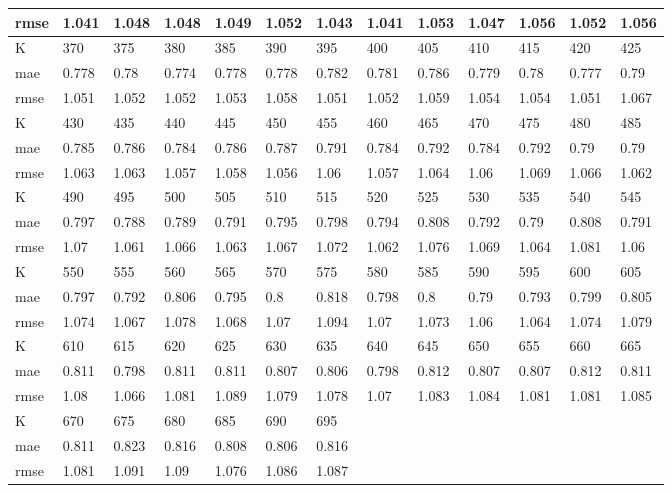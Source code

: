 \begin{appendices}
\begin{center}
\begin{tabularx}{\textwidth}{|l|X|X|X|X|X|X|X|X|X|X|X|X|}
		rmse & 1.041 & 1.048 & 1.048 & 1.049 & 1.052 & 1.043 & 1.041 & 1.053 & 1.047 & 1.056 & 1.052 & 1.056 \\ \hline 
		\hline 
		K & 370 & 375 & 380 & 385 & 390 & 395 & 400 & 405 & 410 & 415 & 420 & 425 \\ \hline 
		mae & 0.778 & 0.78 & 0.774 & 0.778 & 0.778 & 0.782 & 0.781 & 0.786 & 0.779 & 0.78 & 0.777 & 0.79 \\ \hline 
		rmse & 1.051 & 1.052 & 1.052 & 1.053 & 1.058 & 1.051 & 1.052 & 1.059 & 1.054 & 1.054 & 1.051 & 1.067 \\ \hline 
		\hline 
		K & 430 & 435 & 440 & 445 & 450 & 455 & 460 & 465 & 470 & 475 & 480 & 485 \\ \hline 
		mae & 0.785 & 0.786 & 0.784 & 0.786 & 0.787 & 0.791 & 0.784 & 0.792 & 0.784 & 0.792 & 0.79 & 0.79 \\ \hline 
		rmse & 1.063 & 1.063 & 1.057 & 1.058 & 1.056 & 1.06 & 1.057 & 1.064 & 1.06 & 1.069 & 1.066 & 1.062 \\ \hline 
		\hline 
		K & 490 & 495 & 500 & 505 & 510 & 515 & 520 & 525 & 530 & 535 & 540 & 545 \\ \hline 
		mae & 0.797 & 0.788 & 0.789 & 0.791 & 0.795 & 0.798 & 0.794 & 0.808 & 0.792 & 0.79 & 0.808 & 0.791 \\ \hline 
		rmse & 1.07 & 1.061 & 1.066 & 1.063 & 1.067 & 1.072 & 1.062 & 1.076 & 1.069 & 1.064 & 1.081 & 1.06 \\ \hline 
		\hline 
		K & 550 & 555 & 560 & 565 & 570 & 575 & 580 & 585 & 590 & 595 & 600 & 605 \\ \hline 
		mae & 0.797 & 0.792 & 0.806 & 0.795 & 0.8 & 0.818 & 0.798 & 0.8 & 0.79 & 0.793 & 0.799 & 0.805 \\ \hline 
		rmse & 1.074 & 1.067 & 1.078 & 1.068 & 1.07 & 1.094 & 1.07 & 1.073 & 1.06 & 1.064 & 1.074 & 1.079 \\ \hline 
		\hline 
		K & 610 & 615 & 620 & 625 & 630 & 635 & 640 & 645 & 650 & 655 & 660 & 665 \\ \hline 
		mae & 0.811 & 0.798 & 0.811 & 0.811 & 0.807 & 0.806 & 0.798 & 0.812 & 0.807 & 0.807 & 0.812 & 0.811 \\ \hline 
		rmse & 1.08 & 1.066 & 1.081 & 1.089 & 1.079 & 1.078 & 1.07 & 1.083 & 1.084 & 1.081 & 1.081 & 1.085 \\ \hline 
		\hline 
		K & 670 & 675 & 680 & 685 & 690 & 695  & & & & & & \\ \hline 
		mae & 0.811 & 0.823 & 0.816 & 0.808 & 0.806 & 0.816 & & & & & &  \\ \hline 
		rmse & 1.081 & 1.091 & 1.09 & 1.076 & 1.086 & 1.087  & & & & & & \\ \hline 
	\end{tabularx} 
\end{center}


\end{appendices}
